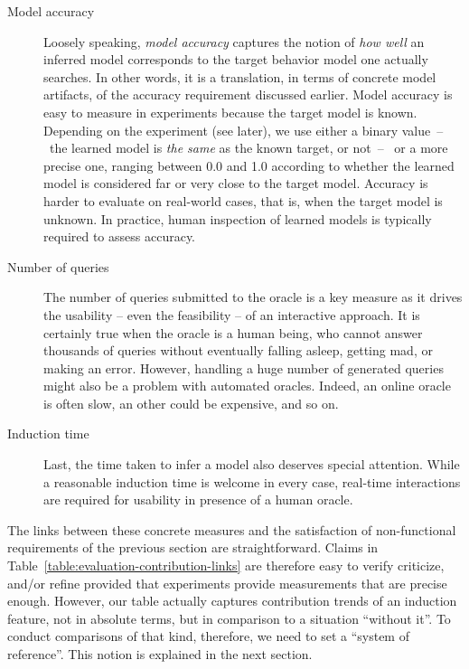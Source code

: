 \begin{description}

\item[Model accuracy] Loosely speaking, \emph{model accuracy} captures the notion of \emph{how well} an inferred model corresponds to the target behavior model one actually searches. In other words, it is a translation, in terms of concrete model artifacts, of the accuracy requirement discussed earlier. Model accuracy is easy to measure in experiments because the target model is known. Depending on the experiment (see later), we use either a binary value~--~the learned model is \emph{the same} as the known target, or not~--~ or a more precise one, ranging between 0.0 and 1.0 according to whether the learned model is considered far or very close to the target model. Accuracy is harder to evaluate on real-world cases, that is, when the target model is unknown. In practice, human inspection of learned models is typically required to assess accuracy.

\item[Number of queries] The number of queries submitted to the oracle is a key measure as it drives the usability -- even the feasibility -- of an interactive approach. It is certainly true when the oracle is a human being, who cannot answer thousands of queries without eventually falling asleep, getting mad, or making an error. However, handling a huge number of generated queries might also be a problem with automated oracles. Indeed, an online oracle is often slow, an other could be expensive, and so on.

\item[Induction time] Last, the time taken to infer a model also deserves special attention. While a reasonable induction time is welcome in every case, real-time interactions are required for usability in presence of a human oracle.

\end{description}

The links between these concrete measures and the satisfaction of non-functional requirements of the previous section are straightforward. Claims in Table~\ref{table:evaluation-contribution-links} are therefore easy to verify criticize, and/or refine provided that experiments provide measurements that are precise enough. However, our table actually captures contribution trends of an induction feature, not in absolute terms, but in comparison to a situation ``without it''. To conduct comparisons of that kind, therefore, we need to set a ``system of reference''. This notion is explained in the next section. 

